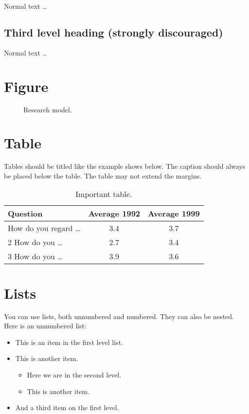 \documentclass[a4paper,11pt,article,oneside]{memoir}
\begin{document}
Normal text \dots

\subsection{Third level heading (strongly discouraged)}

Normal text \dots

\section{Figure}

\begin{figure}[H]
  \ECISfigureexample %
  \caption{Research model.} %
\end{figure}


\section{Table}
Tables should be titled like the example shows below. The caption should always be placed below the table. The table may not extend the margins.

\begin{table}[H]
  \begin{tabular}{@{}|l|c|c|@{}}
    \hline
    \bigstrut[t] Question                  & Average 1992 & Average 1999\\
    \hline
    \bigstrut[t] 1 How do you regard \dots & 3.4 & 3.7\\
                 2 How do you \dots        & 2.7 & 3.4\\
                 3 How do you \dots        & 3.9 & 3.6\\
    \hline
  \end{tabular}
  \caption{Important table.}
\end{table}

\section{Lists}
You can use lists, both unnumbered and numbered. They can also be nested. Here is an unnumbered list:

\begin{itemize}
\item This is an item in the first level list.
\item This is another item.
  \begin{itemize}
  \item Here we are in the second level.
  \item This is another item.
  \end{itemize}
\item And a third item on the first level.
\end{itemize}
\end{document}
